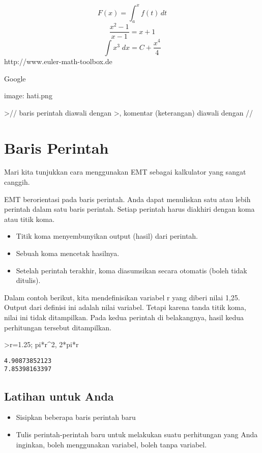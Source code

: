 \documentclass[
]{book}
\providecommand{\tightlist}{%
  \setlength{\itemsep}{0pt}\setlength{\parskip}{0pt}}
\begin{document}
\[F(x) = \int_a^x f(t) \, dt\]\[\frac{x^2-1}{x-1} = x + 1\] \[\int {x^3}{\;dx}=C+\frac{x^4}{4}\] http://www.euler-math-toolbox.de

Google

image: hati.png

\textgreater// baris perintah diawali dengan \textgreater, komentar (keterangan) diawali dengan //

\chapter{Baris Perintah}\label{baris-perintah}

Mari kita tunjukkan cara menggunakan EMT sebagai kalkulator yang sangat canggih.

EMT berorientasi pada baris perintah. Anda dapat menuliskan satu atau lebih perintah dalam satu baris perintah. Setiap perintah harus diakhiri dengan koma atau titik koma.

\begin{itemize}
\tightlist
\item
  Titik koma menyembunyikan output (hasil) dari perintah.
\item
  Sebuah koma mencetak hasilnya.
\item
  Setelah perintah terakhir, koma diasumsikan secara otomatis (boleh tidak ditulis).
\end{itemize}

Dalam contoh berikut, kita mendefinisikan variabel r yang diberi nilai 1,25. Output dari definisi ini adalah nilai variabel. Tetapi karena tanda titik koma, nilai ini tidak ditampilkan. Pada kedua perintah di belakangnya, hasil kedua perhitungan tersebut ditampilkan.

\textgreater r=1.25; pi*r\^{}2, 2*pi*r

\begin{verbatim}
4.90873852123
7.85398163397
\end{verbatim}

\section{Latihan untuk Anda}\label{latihan-untuk-anda}

\begin{itemize}
\tightlist
\item
  Sisipkan beberapa baris perintah baru
\item
  Tulis perintah-perintah baru untuk melakukan suatu perhitungan yang Anda inginkan, boleh menggunakan variabel, boleh tanpa variabel.
\end{itemize}
\end{document}
